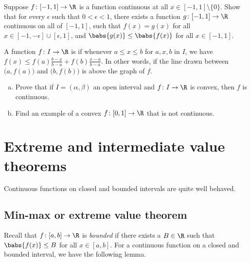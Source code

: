 \begin{exercise}
Suppose $f \colon [-1,1] \to \R$ is a function continuous at all $x \in
[-1,1] \setminus \{ 0 \}$.  Show that for every $\epsilon$ such
that $0 < \epsilon < 1$, there exists
a function $g \colon [-1,1] \to \R$ continuous on all of $[-1,1]$, such that
$f(x) = g(x)$ for all $x \in [-1,-\epsilon] \cup [\epsilon,1]$, and 
$\babs{g(x)} \leq \babs{f(x)}$ for all $x \in [-1,1]$.
\end{exercise}

\begin{exercise}[Challenging]
A function $f \colon I \to \R$ is \emph{} if
whenever $a \leq x \leq b$ for $a,x,b$ in $I$, we have
$f(x) \leq f(a) \frac{b-x}{b-a} + f(b) \frac{x-a}{b-a}$.  In other words,
if the line drawn between $\bigl(a,f(a)\bigr)$ and $\bigl(b,f(b)\bigr)$ 
is above the graph of $f$.
\begin{enumerate}[a)]
\item
Prove that
if $I = (\alpha,\beta)$ an open interval and $f \colon I \to \R$ is convex,
then $f$ is continuous.
\item
Find an example of a convex $f \colon [0,1] \to \R$ that is
not continuous.
\end{enumerate}
\end{exercise}



\sectionnewpage
\section{Extreme and intermediate value theorems}
\label{sec:minmaxint}



Continuous functions on closed and bounded intervals
are quite well behaved.

\subsection{Min-max or extreme value theorem}

Recall that $f \colon [a,b] \to \R$ is
\emph{bounded}
if there exists a $B \in \R$ such that
$\babs{f(x)} \leq B$ for all $x \in [a,b]$.
For a continuous function on a closed and bounded interval, we have the following lemma.


